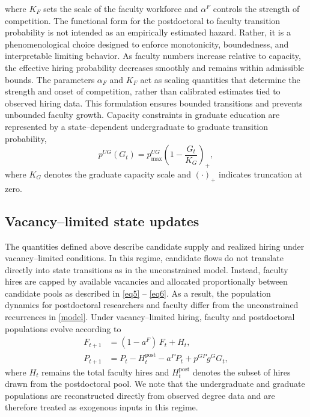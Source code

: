 \documentclass[3p]{elsarticle}%
\theoremstyle{definition}
\begin{document}
where $K_F$ sets the scale of the faculty workforce and $\alpha^F$ controls the strength of competition. The functional form for the postdoctoral to faculty transition probability is not intended as an empirically estimated hazard. Rather, it is a phenomenological choice designed to enforce monotonicity, boundedness, and interpretable limiting behavior. As faculty numbers increase relative to capacity, the effective hiring probability decreases smoothly and remains within admissible bounds. The parameters $\alpha_F$ and $K_F$ act as scaling quantities that determine the strength and onset of competition, rather than calibrated estimates tied to observed hiring data. This formulation ensures bounded transitions and prevents unbounded faculty growth. Capacity constraints in graduate education are represented by a state--dependent undergraduate to graduate transition probability,
\begin{equation}
p^{UG}(G_t) = p^{UG}_{\max} \left( 1 - \frac{G_t}{K_G} \right)_+ ,
\end{equation}
where $K_G$ denotes the graduate capacity scale and $(\cdot)_+$ indicates truncation at zero.

\subsection{Vacancy--limited state updates}
\noindent The quantities defined above describe candidate supply and realized hiring under vacancy--limited conditions. In this regime, candidate flows do not translate directly into state transitions as in the unconstrained model. Instead, faculty hires are capped by available vacancies and allocated proportionally between candidate pools as described in  \eqref{eq5} -- \eqref{eq6}. As a result, the population dynamics for postdoctoral researchers and faculty differ from the unconstrained recurrences in \eqref{model}. Under vacancy--limited hiring, faculty and postdoctoral populations evolve according to
\begin{equation}
\begin{aligned}
F_{t+1}& = (1 - a^F)\,F_t + H_t,\\
P_{t+1}& = P_t - H_t^{\text{post}} - a^P P_t + p^{GP} g^G G_t,
\end{aligned}
\end{equation}
 where $H_t$ remains the total faculty hires and $H_t^{\text{post}}$ denotes the subset of hires drawn from the postdoctoral pool. We note that the undergraduate and graduate populations are reconstructed directly from observed degree data and are therefore treated as exogenous inputs in this regime.
\end{document}
